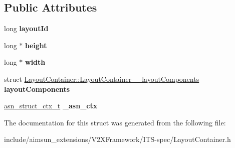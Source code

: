 \subsection*{Public Attributes}
\begin{DoxyCompactItemize}
\item 
long {\bfseries layout\+Id}\hypertarget{structLayoutContainer_ad9d52808a952de7acd4fe83a2c340855}{}\label{structLayoutContainer_ad9d52808a952de7acd4fe83a2c340855}

\item 
long $\ast$ {\bfseries height}\hypertarget{structLayoutContainer_a98b1cc3a0502e37fd3d129cdb797e1e1}{}\label{structLayoutContainer_a98b1cc3a0502e37fd3d129cdb797e1e1}

\item 
long $\ast$ {\bfseries width}\hypertarget{structLayoutContainer_af4f7562a6189176ee6e34c68f6afad94}{}\label{structLayoutContainer_af4f7562a6189176ee6e34c68f6afad94}

\item 
struct \hyperlink{structLayoutContainer_1_1LayoutContainer____layoutComponents}{Layout\+Container\+::\+Layout\+Container\+\_\+\+\_\+layout\+Components} {\bfseries layout\+Components}\hypertarget{structLayoutContainer_aa90e233d65d91b827a9db9daf0c08a05}{}\label{structLayoutContainer_aa90e233d65d91b827a9db9daf0c08a05}

\item 
\hyperlink{structasn__struct__ctx__s}{asn\+\_\+struct\+\_\+ctx\+\_\+t} {\bfseries \+\_\+asn\+\_\+ctx}\hypertarget{structLayoutContainer_aeb2bf3af389baddbc772913eb79ba0d7}{}\label{structLayoutContainer_aeb2bf3af389baddbc772913eb79ba0d7}

\end{DoxyCompactItemize}


The documentation for this struct was generated from the following file\+:\begin{DoxyCompactItemize}
\item 
include/aimsun\+\_\+extensions/\+V2\+X\+Framework/\+I\+T\+S-\/spec/Layout\+Container.\+h\end{DoxyCompactItemize}
